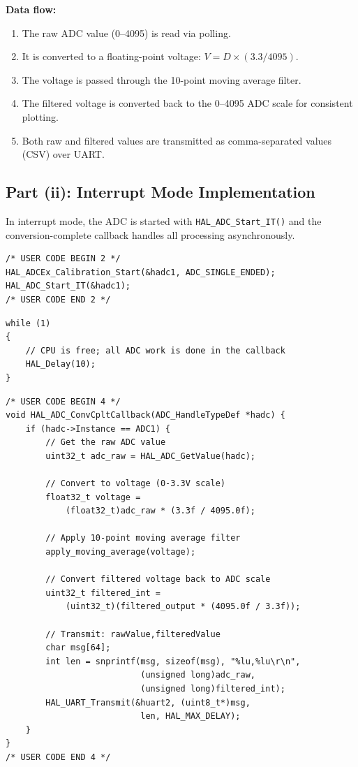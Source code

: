 \documentclass[12pt,a4paper]{article}
\begin{document}
\textbf{Data flow:}
\begin{enumerate}
    \item The raw ADC value (0--4095) is read via polling.
    \item It is converted to a floating-point voltage: $V = D \times (3.3 / 4095)$.
    \item The voltage is passed through the 10-point moving average filter.
    \item The filtered voltage is converted back to the 0--4095 ADC scale for consistent plotting.
    \item Both raw and filtered values are transmitted as comma-separated values (CSV) over UART.
\end{enumerate}

\subsection{Part (ii): Interrupt Mode Implementation}

In interrupt mode, the ADC is started with \texttt{HAL\_ADC\_Start\_IT()} and the conversion-complete callback handles all processing asynchronously.

\begin{lstlisting}[caption=Task 2 -- Interrupt Mode: Initialisation]
/* USER CODE BEGIN 2 */
HAL_ADCEx_Calibration_Start(&hadc1, ADC_SINGLE_ENDED);
HAL_ADC_Start_IT(&hadc1);
/* USER CODE END 2 */
\end{lstlisting}

\begin{lstlisting}[caption=Task 2 -- Interrupt Mode: Main Loop]
while (1)
{
    // CPU is free; all ADC work is done in the callback
    HAL_Delay(10);
}
\end{lstlisting}

\begin{lstlisting}[caption=Task 2 -- Interrupt Mode: ADC Callback]
/* USER CODE BEGIN 4 */
void HAL_ADC_ConvCpltCallback(ADC_HandleTypeDef *hadc) {
    if (hadc->Instance == ADC1) {
        // Get the raw ADC value
        uint32_t adc_raw = HAL_ADC_GetValue(hadc);

        // Convert to voltage (0-3.3V scale)
        float32_t voltage =
            (float32_t)adc_raw * (3.3f / 4095.0f);

        // Apply 10-point moving average filter
        apply_moving_average(voltage);

        // Convert filtered voltage back to ADC scale
        uint32_t filtered_int =
            (uint32_t)(filtered_output * (4095.0f / 3.3f));

        // Transmit: rawValue,filteredValue
        char msg[64];
        int len = snprintf(msg, sizeof(msg), "%lu,%lu\r\n",
                           (unsigned long)adc_raw,
                           (unsigned long)filtered_int);
        HAL_UART_Transmit(&huart2, (uint8_t*)msg,
                           len, HAL_MAX_DELAY);
    }
}
/* USER CODE END 4 */
\end{lstlisting}
\end{document}
